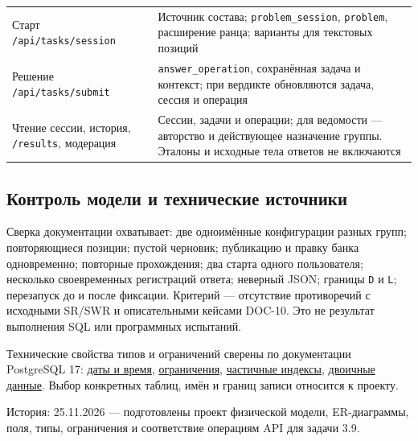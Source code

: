 \documentclass[12pt,a4paper]{article}
\begin{document}
{\begin{longtable}[]{@{}
  >{\raggedright\arraybackslash}p{}
  >{\raggedright\arraybackslash}p{}@{}}
Старт \texttt{/\allowbreak{}api/\allowbreak{}tasks/\allowbreak{}session} & Источник состава; \texttt{problem\_\allowbreak{}session}, \texttt{problem}, расширение ранца; варианты для текстовых позиций \\
Решение \texttt{/\allowbreak{}api/\allowbreak{}tasks/\allowbreak{}submit} & \texttt{answer\_\allowbreak{}operation}, сохранённая задача и контекст; при вердикте обновляются задача, сессия и операция \\
Чтение сессии, история, \texttt{/results}, модерация & Сессии, задачи и операции; для ведомости --- авторство и действующее назначение группы. Эталоны и исходные тела ответов не включаются \\
\end{longtable}
}

\subsection{Контроль модели и технические источники}\label{ux43aux43eux43dux442ux440ux43eux43bux44c-ux43cux43eux434ux435ux43bux438-ux438-ux442ux435ux445ux43dux438ux447ux435ux441ux43aux438ux435-ux438ux441ux442ux43eux447ux43dux438ux43aux438}

\hypertarget{контроль-модели-и-технические-источники}{}

Сверка документации охватывает: две одноимённые конфигурации разных групп; повторяющиеся позиции; пустой черновик; публикацию и правку банка одновременно; повторные прохождения; два старта одного пользователя; несколько своевременных регистраций ответа; неверный JSON; границы \texttt{D} и \texttt{L}; перезапуск до и после фиксации. Критерий --- отсутствие противоречий с исходными SR/SWR и описательными кейсами DOC-10. Это не результат выполнения SQL или программных испытаний.

Технические свойства типов и ограничений сверены по документации PostgreSQL 17: \href{https://www.postgresql.org/docs/17/datatype-datetime.html}{даты и время}, \href{https://www.postgresql.org/docs/17/ddl-constraints.html}{ограничения}, \href{https://www.postgresql.org/docs/17/indexes-partial.html}{частичные индексы}, \href{https://www.postgresql.org/docs/17/datatype-binary.html}{двоичные данные}. Выбор конкретных таблиц, имён и границ записи относится к проекту.

История: 25.11.2026 --- подготовлены проект физической модели, ER-диаграммы, поля, типы, ограничения и соответствие операциям API для задачи 3.9.
\end{document}
